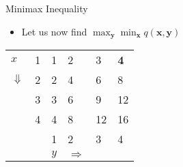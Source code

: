 \documentclass[xcolor=table]{beamer}
\begin{document}
        \begin{frame}{Minimax Inequality}
            \begin{itemize}[<+->]
                \item Let us now find $\max _{\boldsymbol{y}}\min _{\boldsymbol{x}} q(\boldsymbol{x}, \boldsymbol{y})$
            \end{itemize}
            
            \begin{table}[]
                \begin{tabular}{llllll}
                \cline{2-2}
                \multicolumn{1}{l|}{$x$}          & \multicolumn{1}{l|}{1} & \cellcolor[HTML]{FFCE93}1 & \cellcolor[HTML]{FFCE93}2 & \cellcolor[HTML]{FFCE93}3 & \cellcolor[HTML]{F8A102}\textbf{4} \\ \cline{2-2}
                \multicolumn{1}{l|}{$\Downarrow$} & \multicolumn{1}{l|}{2} & 2                         & 4                         & 6                         & 8                                  \\ \cline{2-2}
                \multicolumn{1}{l|}{}             & \multicolumn{1}{l|}{3} & 3                         & 6                         & 9                         & 12                                 \\ \cline{2-2}
                \multicolumn{1}{l|}{}             & \multicolumn{1}{l|}{4} & 4                         & 8                         & 12                        & 16                                 \\ \cline{2-6} 
                \multicolumn{1}{l|}{}             & \multicolumn{1}{l|}{}  & \multicolumn{1}{l|}{1}    & \multicolumn{1}{l|}{2}    & \multicolumn{1}{l|}{3}    & \multicolumn{1}{l|}{4}             \\ \cline{2-6} 
                                                  &                        & $y$                       & $\Rightarrow$             &                           &                                   
                \end{tabular}
                \end{table}
            \end{frame}
    
\end{document}
